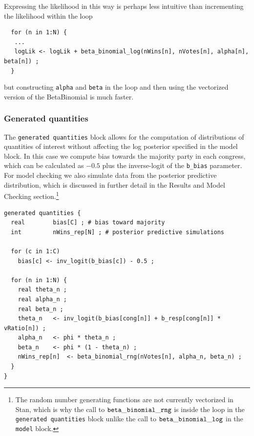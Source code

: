 \noindent Expressing the likelihood in this way is perhaps less intuitive than incrementing the likelihood within the loop

\begin{singlespacing}
\small
\begin{verbatim}
  for (n in 1:N) {
   ...
   logLik <- logLik + beta_binomial_log(nWins[n], nVotes[n], alpha[n], beta[n]) ;
  }
\end{verbatim}
\end{singlespacing}
%
\noindent but constructing {\tt alpha} and {\tt beta} in the loop and then using the vectorized version of the BetaBinomial is much faster.


\subsubsection{Generated quantities}

The {\tt generated quantities} block allows for the computation of distributions of quantities of interest without affecting the log posterior specified in the model block. In this case we compute bias towards the majority party in each congress, which can be calculated as $-0.5$ plus the inverse-logit of the {\tt b\_bias} parameter. For model checking we also simulate data from the posterior predictive distribution, which is discussed in further detail in the Results and Model Checking section.\footnote{The random number generating functions are not currently vectorized in Stan, which is why the call to ${\tt beta\_binomial\_rng}$ is inside the loop in the {\tt generated quantities} block unlike the call to ${\tt beta\_binomial\_log}$ in the {\tt model} block.} 

\begin{singlespacing}
\small
\begin{verbatim}
generated quantities {
  real        bias[C] ; # bias toward majority
  int         nWins_rep[N] ; # posterior predictive simulations

  for (c in 1:C)
    bias[c] <- inv_logit(b_bias[c]) - 0.5 ;

  for (n in 1:N) {
    real theta_n ; 
    real alpha_n ;
    real beta_n ;
    theta_n   <- inv_logit(b_bias[cong[n]] + b_resp[cong[n]] * vRatio[n]) ;
    alpha_n   <- phi * theta_n ;
    beta_n    <- phi * (1 - theta_n) ;
    nWins_rep[n]  <- beta_binomial_rng(nVotes[n], alpha_n, beta_n) ;
  }
}
\end{verbatim}
\end{singlespacing}


